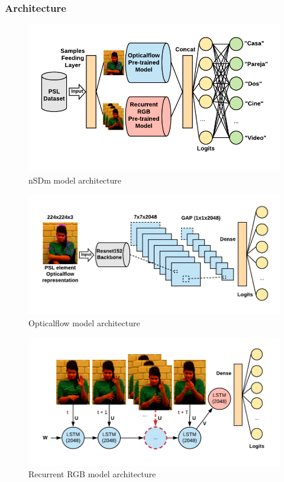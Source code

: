 \documentclass[twocolumn,conference]{article}
\begin{document}
\subsubsection{Architecture}\label{nsdm-architecture}
\begin{figure}[hbt!]
\includegraphics[width=\linewidth]{images/composite-model-architecture.png}
\caption{nSDm model architecture}
\label{fig:opticalflow-two}
\end{figure}

\begin{figure}[hbt!]
\includegraphics[width=\linewidth]{images/opticalflow-model-architecture.png}
\caption{Opticalflow model architecture}
\label{fig:opticalflow-two}
\end{figure}

\begin{figure}[hbt!]
\includegraphics[width=\linewidth]{images/recurrent-rgb-model-architecture.png}
\caption{Recurrent RGB model architecture}
\label{fig:opticalflow-two}
\end{figure}
\end{document}
